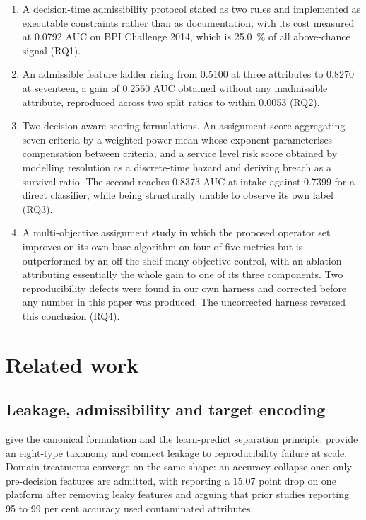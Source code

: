 \begin{enumerate}
\item A decision-time admissibility protocol stated as two rules and implemented as
executable constraints rather than as documentation, with its cost measured at \num{0.0792}
AUC on BPI Challenge 2014, which is \SI{25.0}{\percent} of all above-chance signal (RQ1).

\item An admissible feature ladder rising from \num{0.5100} at three attributes to
\num{0.8270} at seventeen, a gain of \num{0.2560} AUC obtained without any inadmissible
attribute, reproduced across two split ratios to within \num{0.0053} (RQ2).

\item Two decision-aware scoring formulations. An assignment score aggregating seven criteria
by a weighted power mean whose exponent parameterises compensation between criteria, and a
service level risk score obtained by modelling resolution as a discrete-time hazard and
deriving breach as a survival ratio. The second reaches \num{0.8373} AUC at intake against
\num{0.7399} for a direct classifier, while being structurally unable to observe its own
label (RQ3).

\item A multi-objective assignment study in which the proposed operator set improves on its own
base algorithm on four of five metrics but is outperformed by an off-the-shelf many-objective
control, with an ablation attributing essentially the whole gain to one of its three components.
Two reproducibility defects were found in our own harness and corrected before any number in
this paper was produced. The uncorrected harness reversed this conclusion (RQ4).
\end{enumerate}

\section{Related work}

\subsection{Leakage, admissibility and target encoding}

\citet{kaufman2012leakage} give the canonical formulation and the learn-predict separation
principle. \citet{kapoor2023leakage} provide an eight-type taxonomy and connect leakage to
reproducibility failure at scale. Domain treatments converge on the same shape: an
accuracy collapse once only pre-decision features are admitted, with
\citet{mishra2026taxonomy} reporting a \num{15.07} point drop on one platform after removing
leaky features and arguing that prior studies reporting 95 to 99 per cent accuracy used
contaminated attributes.

